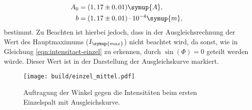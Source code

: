     \begin{align*}
        A_0 &= (1,17 \pm 0,01) \symup{A}, \\
        b   &= (1,17 \pm 0,01) \cdot 10^{-4} \symup{m}, 
    \end{align*}
    bestimmt. Zu Beachten ist hierbei jedoch, dass in der Ausgleichsrechnung der Wert des Hauptmaximums ($I_{\symup{max}}$)
    nicht beachtet wird, da sonst, wie in Gleichung 
    \eqref{eqn:intensitaet-einzel} zu erkennen, durch $\sin(\Phi) = 0$ geteilt werden würde.
    Dieser Wert ist in der Darstellung der Ausgleichskurve markiert.
    \begin{figure}
        \centering
        \texttt{[image: build/einzel\_mittel.pdf]}
        \caption{Auftragung der Winkel gegen die Intensitäten beim ersten Einzelspalt mit Ausgleichskurve.}
        \label{fig:einzel_mittel}
    \end{figure}
%
%
